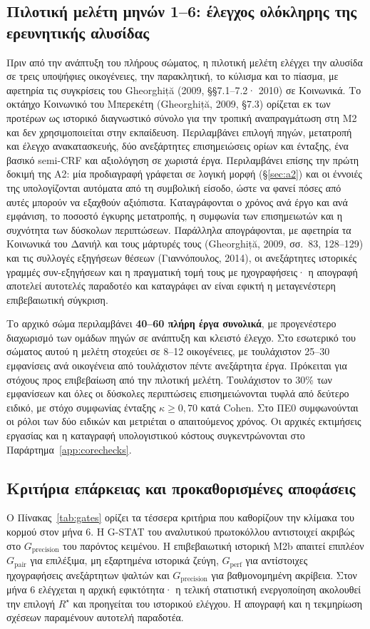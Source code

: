 \documentclass[a4paper]{article}
\newcommand{\Rs}{\ensuremath{R^{\star}}}
\begin{document}
\subsection{Πιλοτική μελέτη μηνών 1--6: έλεγχος ολόκληρης της ερευνητικής αλυσίδας}\label{sec:pilot}
Πριν από την ανάπτυξη του πλήρους σώματος, η πιλοτική μελέτη ελέγχει την αλυσίδα σε τρεις υποψήφιες οικογένειες, την παρακλητική, το κύλισμα και το πίασμα, με αφετηρία τις συγκρίσεις του Gheorghiță (2009, §§7.1--7.2· 2010) σε Κοινωνικά. Το οκτάηχο Κοινωνικό του Μπερεκέτη (Gheorghiță, 2009, §7.3) ορίζεται εκ των προτέρων ως ιστορικό διαγνωστικό σύνολο για την τροπική αναπραγμάτωση στη Μ2 και δεν χρησιμοποιείται στην εκπαίδευση. Περιλαμβάνει επιλογή πηγών, μετατροπή και έλεγχο ανακατασκευής, δύο ανεξάρτητες επισημειώσεις ορίων και ένταξης, ένα βασικό semi-CRF και αξιολόγηση σε χωριστά έργα. Περιλαμβάνει επίσης την πρώτη δοκιμή της Α2: μία προδιαγραφή γράφεται σε λογική μορφή (§\ref{sec:a2}) και οι έννοιές της υπολογίζονται αυτόματα από τη συμβολική είσοδο, ώστε να φανεί πόσες από αυτές μπορούν να εξαχθούν αξιόπιστα. Καταγράφονται ο χρόνος ανά έργο και ανά εμφάνιση, το ποσοστό έγκυρης μετατροπής, η συμφωνία των επισημειωτών και η συχνότητα των δύσκολων περιπτώσεων. Παράλληλα απογράφονται, με αφετηρία τα Κοινωνικά του Δανιήλ και τους μάρτυρές τους (Gheorghiță, 2009, σσ.~83, 128--129) και τις συλλογές εξηγήσεων θέσεων (Γιαννόπουλος, 2014), οι ανεξάρτητες ιστορικές γραμμές συν-εξηγήσεων και η πραγματική τομή τους με ηχογραφήσεις· η απογραφή αποτελεί αυτοτελές παραδοτέο και καταγράφει αν είναι εφικτή η μεταγενέστερη επιβεβαιωτική σύγκριση.

Το αρχικό σώμα περιλαμβάνει \textbf{40--60 πλήρη έργα συνολικά}, με προγενέστερο διαχωρισμό των ομάδων πηγών σε ανάπτυξη και κλειστό έλεγχο. Στο εσωτερικό του σώματος αυτού η μελέτη στοχεύει σε 8--12 οικογένειες, με τουλάχιστον 25--30 εμφανίσεις ανά οικογένεια από τουλάχιστον πέντε ανεξάρτητα έργα. Πρόκειται για στόχους προς επιβεβαίωση από την πιλοτική μελέτη. Τουλάχιστον το 30\% των εμφανίσεων και όλες οι δύσκολες περιπτώσεις επισημειώνονται τυφλά από δεύτερο ειδικό, με στόχο συμφωνίας ένταξης $\kappa\geq0{,}70$ κατά Cohen. Στο ΠΕ0 συμφωνούνται οι ρόλοι των δύο ειδικών και μετριέται ο απαιτούμενος χρόνος. Οι αρχικές εκτιμήσεις εργασίας και η καταγραφή υπολογιστικού κόστους συγκεντρώνονται στο Παράρτημα~\ref{app:corechecks}.

\subsection{Κριτήρια επάρκειας και προκαθορισμένες αποφάσεις}\label{sec:gates}
Ο Πίνακας~\ref{tab:gates} ορίζει τα τέσσερα κριτήρια που καθορίζουν την κλίμακα του κορμού στον μήνα 6. Η G-STAT του αναλυτικού πρωτοκόλλου αντιστοιχεί ακριβώς στο $G_{\mathrm{precision}}$ του παρόντος κειμένου. Η επιβεβαιωτική ιστορική Μ2b απαιτεί επιπλέον $G_{\mathrm{pair}}$ για επιλέξιμα, μη εξαρτημένα ιστορικά ζεύγη, $G_{\mathrm{perf}}$ για αντίστοιχες ηχογραφήσεις ανεξάρτητων ψαλτών και $G_{\mathrm{precision}}$ για βαθμονομημένη ακρίβεια. Στον μήνα 6 ελέγχεται η αρχική εφικτότητα· η τελική στατιστική ενεργοποίηση ακολουθεί την επιλογή $\Rs$ και προηγείται του ιστορικού ελέγχου. Η απογραφή και η τεκμηρίωση σχέσεων παραμένουν αυτοτελή παραδοτέα.
\end{document}
